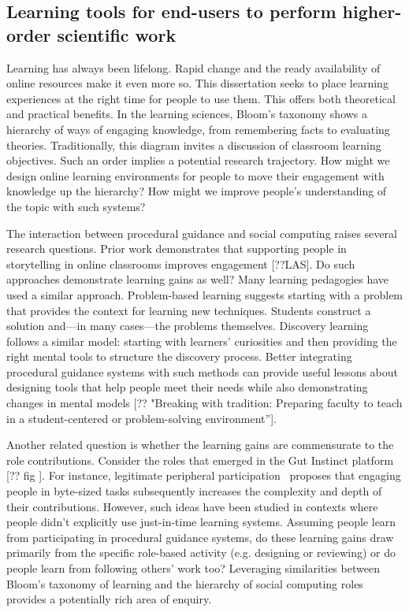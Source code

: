 \subsection{Learning tools for end-users to perform higher-order scientific work}

Learning has always been lifelong. Rapid change and the ready availability of online resources make it even more so. This dissertation seeks to place learning experiences at the right time for people to use them. This offers both theoretical and practical benefits. In the learning sciences, Bloom’s taxonomy shows a hierarchy of ways of engaging knowledge, from remembering facts to evaluating theories. Traditionally, this diagram invites a discussion of classroom learning objectives. Such an order implies a potential research trajectory. How might we design online learning environments for people to move their engagement with knowledge up the hierarchy? How might we improve people's understanding of the topic with such systems?

The interaction between procedural guidance and social computing raises several research questions. Prior work demonstrates that supporting people in storytelling in online classrooms improves engagement [??LAS]. Do such approaches demonstrate learning gains as well? Many learning pedagogies have used a similar approach. Problem-based learning suggests starting with a problem that provides the context for learning new techniques. Students construct a solution and---in many cases---the problems themselves. Discovery learning follows a similar model: starting with learners' curiosities and then providing the right mental tools to structure the discovery process. Better integrating procedural guidance systems with such methods can provide useful lessons about designing tools that help people meet their needs while also demonstrating changes in mental models [?? "Breaking with tradition: Preparing faculty to teach in a student-centered or problem-solving environment”].

Another related question is whether the learning gains are commensurate to the role contributions. Consider the roles that emerged in the Gut Instinct platform [?? fig ]. For instance, legitimate peripheral participation~\cite{Bryant2005} proposes that engaging people in byte-sized tasks subsequently increases the complexity and depth of their contributions. However, such ideas have been studied in contexts where people didn't explicitly use just-in-time learning systems. Assuming people learn from participating in procedural guidance systems, do these learning gains draw primarily from the specific role-based activity (e.g. designing or reviewing) or do people learn from following others' work too? Leveraging similarities between Bloom’s taxonomy of learning and the hierarchy of social computing roles provides a potentially rich area of enquiry.

